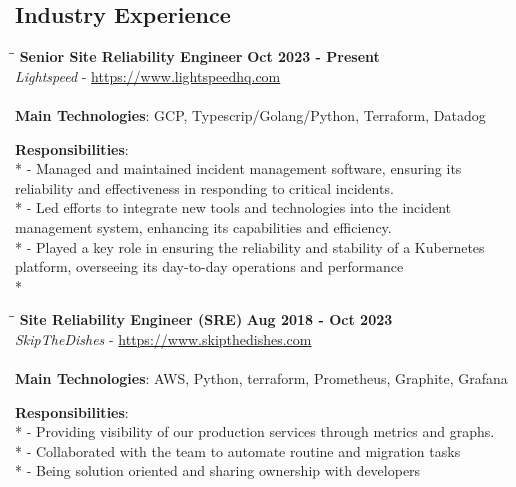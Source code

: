 \documentclass[margin]{res}
\begin{document}
\begin{resume}
  \section{Industry Experience}

\vspace{-0.1in}
\begin{tabbing}
  \hspace{2.3in}\= \hspace{1.7in}\= \kill %
  \textbf{Senior Site Reliability Engineer}    \>\>\textbf{Oct 2023 - Present}\\
  \textit{Lightspeed} - \url{https://www.lightspeedhq.com}\\\\
  \textbf{Main Technologies}: GCP, Typescrip/Golang/Python, Terraform, Datadog
\end{tabbing}\vspace{-20pt}      %
\vspace{2mm}\textbf{Responsibilities}: \\*
  - Managed and maintained incident management software, ensuring its reliability and effectiveness in responding to critical incidents. \\*
  - Led efforts to integrate new tools and technologies into the incident management system, enhancing its capabilities and efficiency. \\*
  - Played a key role in ensuring the reliability and stability of a Kubernetes platform, overseeing its day-to-day operations and performance \\*

\vspace{-0.1in}
\begin{tabbing}
  \hspace{2.3in}\= \hspace{1.7in}\= \kill %
  \textbf{Site Reliability Engineer (SRE)}    \>\>\textbf{Aug 2018 - Oct 2023}\\
  \textit{SkipTheDishes} - \url{https://www.skipthedishes.com}\\\\
  \textbf{Main Technologies}: AWS, Python, terraform, Prometheus, Graphite, Grafana
\end{tabbing}\vspace{-20pt}      %
\vspace{2mm}\textbf{Responsibilities}: \\*
  - Providing visibility of our production services through metrics and graphs. \\*
  - Collaborated with the team to automate routine and migration tasks \\*
  - Being solution oriented and sharing ownership with developers \\


\end{resume}
\end{document}
